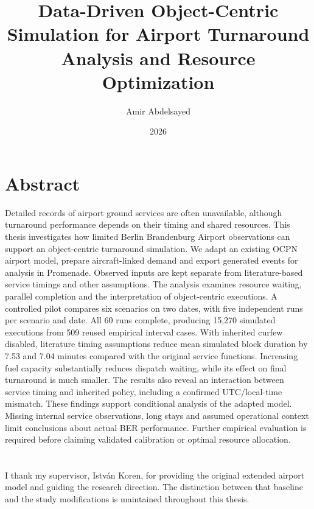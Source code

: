\documentclass[
]{elteikthesis}[2024/04/26]
\title{Data-Driven Object-Centric Simulation for Airport Turnaround Analysis and Resource Optimization} %
\date{2026} %
\author{Amir Abdelsayed}
\affiliation{Head of Department} %
\begin{document}
\maketitle
\chapter*{Abstract}
Detailed records of airport ground services are often unavailable, although turnaround performance depends on their timing and shared resources. This thesis investigates how limited Berlin Brandenburg Airport observations can support an object-centric turnaround simulation. We adapt an existing OCPN airport model, prepare aircraft-linked demand and export generated events for analysis in Promenade. Observed inputs are kept separate from literature-based service timings and other assumptions. The analysis examines resource waiting, parallel completion and the interpretation of object-centric executions. A controlled pilot compares six scenarios on two dates, with five independent runs per scenario and date. All 60 runs complete, producing 15,270 simulated executions from 509 reused empirical interval cases. With inherited curfew disabled, literature timing assumptions reduce mean simulated block duration by 7.53 and 7.04 minutes compared with the original service functions. Increasing fuel capacity substantially reduces dispatch waiting, while its effect on final turnaround is much smaller. The results also reveal an interaction between service timing and inherited policy, including a confirmed UTC/local-time mismatch. These findings support conditional analysis of the adapted model. Missing internal service observations, long stays and assumed operational context limit conclusions about actual BER performance. Further empirical evaluation is required before claiming validated calibration or optimal resource allocation.
\cleardoublepage
\tableofcontents
\cleardoublepage

\cleardoublepage

\cleardoublepage

\cleardoublepage

\cleardoublepage

\cleardoublepage

\cleardoublepage
\chapter*{\acklabel}
I thank my supervisor, Istv\'an Koren, for providing the original extended airport model and guiding the research direction. The distinction between that baseline and the study modifications is maintained throughout this thesis.
\cleardoublepage
\appendix

\cleardoublepage
{}
{}
\printbibliography[title=\biblabel]
\cleardoublepage
\listoffigures
\cleardoublepage
\listoftables
\end{document}
